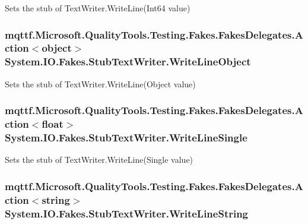 Sets the stub of Text\-Writer.\-Write\-Line(\-Int64 value)

\hypertarget{class_system_1_1_i_o_1_1_fakes_1_1_stub_text_writer_a7fa6292c8ed88f2f316e22b2b23b49ad}{
\subsubsection[{Write\-Line\-Object}]{\setlength{\rightskip}{0pt plus 5cm}mqttf.\-Microsoft.\-Quality\-Tools.\-Testing.\-Fakes.\-Fakes\-Delegates.\-Action$<$object$>$ System.\-I\-O.\-Fakes.\-Stub\-Text\-Writer.\-Write\-Line\-Object}}\label{class_system_1_1_i_o_1_1_fakes_1_1_stub_text_writer_a7fa6292c8ed88f2f316e22b2b23b49ad}


Sets the stub of Text\-Writer.\-Write\-Line(\-Object value)

\hypertarget{class_system_1_1_i_o_1_1_fakes_1_1_stub_text_writer_ad619ce7db23ed41b4243fea4cc2dc38a}{
\subsubsection[{Write\-Line\-Single}]{\setlength{\rightskip}{0pt plus 5cm}mqttf.\-Microsoft.\-Quality\-Tools.\-Testing.\-Fakes.\-Fakes\-Delegates.\-Action$<$float$>$ System.\-I\-O.\-Fakes.\-Stub\-Text\-Writer.\-Write\-Line\-Single}}\label{class_system_1_1_i_o_1_1_fakes_1_1_stub_text_writer_ad619ce7db23ed41b4243fea4cc2dc38a}


Sets the stub of Text\-Writer.\-Write\-Line(\-Single value)

\hypertarget{class_system_1_1_i_o_1_1_fakes_1_1_stub_text_writer_a8d82fc9c71762cbc1110e316625bc7fa}{
\subsubsection[{Write\-Line\-String}]{\setlength{\rightskip}{0pt plus 5cm}mqttf.\-Microsoft.\-Quality\-Tools.\-Testing.\-Fakes.\-Fakes\-Delegates.\-Action$<$string$>$ System.\-I\-O.\-Fakes.\-Stub\-Text\-Writer.\-Write\-Line\-String}}\label{class_system_1_1_i_o_1_1_fakes_1_1_stub_text_writer_a8d82fc9c71762cbc1110e316625bc7fa}


